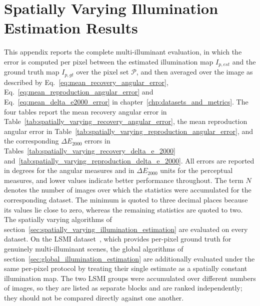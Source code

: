 \section{Spatially Varying Illumination Estimation Results}
\label{sec:appendix_spatially_varying_results}

This appendix reports the complete multi-illuminant evaluation, in which the error is computed per pixel between the estimated illumination map $I_{p,est}$ and the ground truth map $I_{p,gt}$ over the pixel set $\mathcal{P}$, and then averaged over the image as described by Eq.~\ref{eq:mean_recovery_angular_error}, Eq.~\ref{eq:mean_reproduction_angular_error} and Eq.~\ref{eq:mean_delta_e2000_error} in chapter~\ref{chp:datasets_and_metrics}. The four tables report the mean recovery angular error in Table~\ref{tab:spatially_varying_recovery_angular_error}, the mean reproduction angular error in Table~\ref{tab:spatially_varying_reproduction_angular_error}, and the corresponding $\Delta E_{2000}$ errors in Tables~\ref{tab:spatially_varying_recovery_delta_e_2000} and~\ref{tab:spatially_varying_reproduction_delta_e_2000}. All errors are reported in degrees for the angular measures and in $\Delta E_{2000}$ units for the perceptual measures, and lower values indicate better performance throughout. The term $N$ denotes the number of images over which the statistics were accumulated for the corresponding dataset. The minimum is quoted to three decimal places because its values lie close to zero, whereas the remaining statistics are quoted to two. The spatially varying algorithms of section~\ref{sec:spatially_varying_illumination_estimation} are evaluated on every dataset. On the LSMI dataset~\cite{kim2021lsmi}, which provides per-pixel ground truth for genuinely multi-illuminant scenes, the global algorithms of section~\ref{sec:global_illumination_estimation} are additionally evaluated under the same per-pixel protocol by treating their single estimate as a spatially constant illumination map. The two LSMI groups were accumulated over different numbers of images, so they are listed as separate blocks and are ranked independently; they should not be compared directly against one another.

